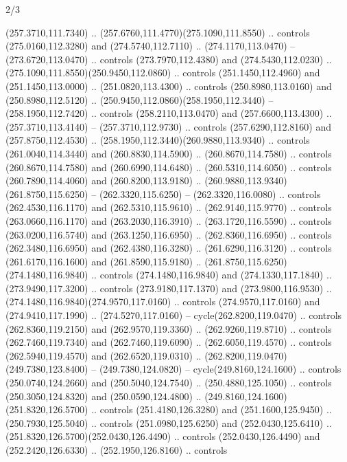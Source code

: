 \begin{flagdescription}{2/3}
\begin{scope}[xshift=0.5\flaglength,yshift=0.5\flagwidth,scale=\flagwidth/259.2]
\begin{scope}[y=0.8pt, x=0.8pt, yscale=-1,shift={(-243,-162)}]
      (257.3710,111.7340) .. (257.6760,111.4770)(275.1090,111.8550) .. controls
      (275.0160,112.3280) and (274.5740,112.7110) .. (274.1170,113.0470) --
      (273.6720,113.0470) .. controls (273.7970,112.4380) and (274.5430,112.0230) ..
      (275.1090,111.8550)(250.9450,112.0860) .. controls (251.1450,112.4960) and
      (251.1450,113.0000) .. (251.0820,113.4300) .. controls (250.8980,113.0160) and
      (250.8980,112.5120) .. (250.9450,112.0860)(258.1950,112.3440) --
      (258.1950,112.7420) .. controls (258.2110,113.0470) and (257.6600,113.4300) ..
      (257.3710,113.4140) -- (257.3710,112.9730) .. controls (257.6290,112.8160) and
      (257.8750,112.4530) .. (258.1950,112.3440)(260.9880,113.9340) .. controls
      (261.0040,114.3440) and (260.8830,114.5900) .. (260.8670,114.7580) .. controls
      (260.8670,114.7580) and (260.6990,114.6480) .. (260.5310,114.6050) .. controls
      (260.7890,114.4060) and (260.8200,113.9180) ..
      (260.9880,113.9340)(261.8750,115.6250) -- (262.3320,115.6250) --
      (262.3320,116.0080) .. controls (262.4530,116.1170) and (262.5310,115.9610) ..
      (262.9140,115.9770) .. controls (263.0660,116.1170) and (263.2030,116.3910) ..
      (263.1720,116.5590) .. controls (263.0200,116.5740) and (263.1250,116.6950) ..
      (262.8360,116.6950) .. controls (262.3480,116.6950) and (262.4380,116.3280) ..
      (261.6290,116.3120) .. controls (261.6170,116.1600) and (261.8590,115.9180) ..
      (261.8750,115.6250)(274.1480,116.9840) .. controls (274.1480,116.9840) and
      (274.1330,117.1840) .. (273.9490,117.3200) .. controls (273.9180,117.1370) and
      (273.9800,116.9530) .. (274.1480,116.9840)(274.9570,117.0160) .. controls
      (274.9570,117.0160) and (274.9410,117.1990) .. (274.5270,117.0160) --
      cycle(262.8200,119.0470) .. controls (262.8360,119.2150) and
      (262.9570,119.3360) .. (262.9260,119.8710) .. controls (262.7460,119.7340) and
      (262.7460,119.6090) .. (262.6050,119.4570) .. controls (262.5940,119.4570) and
      (262.6520,119.0310) .. (262.8200,119.0470)(249.7380,123.8400) --
      (249.7380,124.0820) -- cycle(249.8160,124.1600) .. controls
      (250.0740,124.2660) and (250.5040,124.7540) .. (250.4880,125.1050) .. controls
      (250.3050,124.8320) and (250.0590,124.4800) ..
      (249.8160,124.1600)(251.8320,126.5700) .. controls (251.4180,126.3280) and
      (251.1600,125.9450) .. (250.7930,125.5040) .. controls (251.0980,125.6250) and
      (252.0430,125.6410) .. (251.8320,126.5700)(252.0430,126.4490) .. controls
      (252.0430,126.4490) and (252.2420,126.6330) .. (252.1950,126.8160) .. controls

\end{scope}
\end{scope}
\end{flagdescription}
